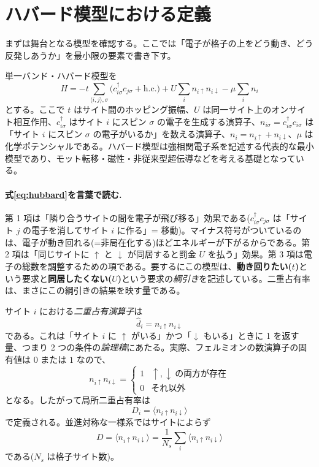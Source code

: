 \documentclass[11pt,a4paper]{ltjsarticle}
\newcommand{\ev}[1]{\langle #1\rangle}
\newcommand{\cd}{c^\dagger}
\newcommand{\up}{\uparrow}
\newcommand{\dn}{\downarrow}
\begin{document}
\section{ハバード模型における定義}

まずは舞台となる模型を確認する。ここでは「電子が格子の上をどう動き、どう反発しあうか」を最小限の要素で書き下す。

単一バンド・ハバード模型を
\begin{equation}
  H = -t\!\!\sum_{\langle i,j\rangle,\sigma}\!\!\bigl(\cd_{i\sigma}c_{j\sigma}+\mathrm{h.c.}\bigr)
    + U\sum_i n_{i\up}n_{i\dn} - \mu\sum_i n_i
  \label{eq:hubbard}
\end{equation}
とする。ここで $t$ はサイト間のホッピング振幅、$U$ は同一サイト上のオンサイト相互作用、$\cd_{i\sigma}$ はサイト $i$ にスピン $\sigma$ の電子を生成する演算子、$n_{i\sigma}=\cd_{i\sigma}c_{i\sigma}$ は「サイト $i$ にスピン $\sigma$ の電子がいるか」を数える演算子、$n_i=n_{i\up}+n_{i\dn}$、$\mu$ は化学ポテンシャルである。ハバード模型は強相関電子系を記述する代表的な最小模型であり、モット転移・磁性・非従来型超伝導などを考える基礎となっている。

\paragraph{式\eqref{eq:hubbard}を言葉で読む.}第 1 項は「隣り合うサイトの間を電子が飛び移る」効果である($\cd_{i\sigma}c_{j\sigma}$ は「サイト $j$ の電子を消してサイト $i$ に作る」= 移動)。マイナス符号がついているのは、電子が動き回れる(=非局在化する)ほどエネルギーが下がるからである。第 2 項は「同じサイトに $\up$ と $\dn$ が同居すると罰金 $U$ を払う」効果。第 3 項は電子の総数を調整するための項である。要するにこの模型は、\textbf{動き回りたい($t$)}という要求と\textbf{同居したくない($U$)}という要求の\emph{綱引き}を記述している。二重占有率は、まさにこの綱引きの結果を映す量である。

サイト $i$ における\emph{二重占有演算子}は
\begin{equation}
  \hat d_i = n_{i\up}n_{i\dn}
\end{equation}
である。これは「サイト $i$ に $\up$ がいる」かつ「$\dn$ もいる」ときに 1 を返す量、つまり 2 つの条件の\emph{論理積}にあたる。実際、フェルミオンの数演算子の固有値は $0$ または $1$ なので、
\begin{equation}
  n_{i\up}n_{i\dn} =
  \begin{cases}
    1 & \up,\dn\ \text{の両方が存在}\\
    0 & \text{それ以外}
  \end{cases}
\end{equation}
となる。したがって局所二重占有率は
\begin{equation}
  \boxed{\ D_i = \ev{n_{i\up}n_{i\dn}}\ }
\end{equation}
で定義される。並進対称な一様系ではサイトによらず
\begin{equation}
  D = \ev{n_{i\up}n_{i\dn}} = \frac{1}{N_s}\sum_i \ev{n_{i\up}n_{i\dn}}
\end{equation}
である($N_s$ は格子サイト数)。
\end{document}
